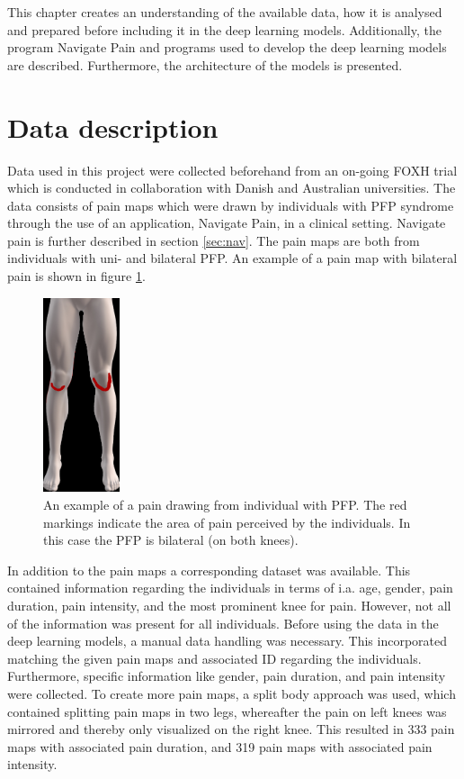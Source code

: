 This chapter creates an understanding of the available data, how it is analysed and prepared before including it in the deep learning models. Additionally, the program Navigate Pain and programs used to develop the deep learning models are described. Furthermore, the architecture of the models is presented.

\section{Data description}
Data used in this project were collected beforehand from an on-going FOXH trial which is conducted in collaboration with Danish and Australian universities. The data consists of pain maps which were drawn by individuals with PFP syndrome through the use of an application, Navigate Pain, in a clinical setting. Navigate pain is further described in section \ref{sec:nav}. The pain maps are both from individuals with uni- and bilateral PFP. An example of a pain map with bilateral pain is shown in figure \ref{fig:kneepainmap}.

\begin{figure} [H]
\centering
\includegraphics[width=0.2\textwidth]{figures/kneepainmap}
\caption{An example of a pain drawing from individual with PFP. The red markings indicate the area of pain perceived by the individuals. In this case the PFP is bilateral (on both knees).}
\label{fig:kneepainmap}
\end{figure}

\noindent
In addition to the pain maps a corresponding dataset was available. This contained information regarding the individuals in terms of i.a. age, gender, pain duration, pain intensity, and the most prominent knee for pain. However, not all of the information was present for all individuals.
Before using the data in the deep learning models, a manual data handling was necessary. This incorporated matching the given pain maps and associated ID regarding the individuals. Furthermore, specific information like gender, pain duration, and pain intensity were collected.\newline
\noindent
To create more pain maps, a split body approach was used, which contained splitting pain maps in two legs, whereafter the pain on left knees was mirrored and thereby only visualized on the right knee. This resulted in 333 pain maps with associated pain duration, and 319 pain maps with associated pain intensity. 



